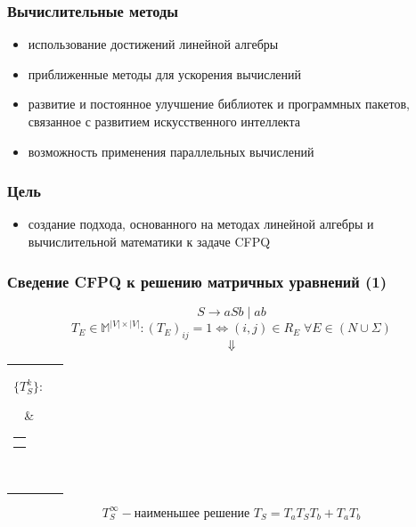 \documentclass[xcolor=table]{beamer}
\begin{document}
\begin{frame}[fragile]
  \transwipe[direction=90]
  \frametitle{Вычислительные методы}
\begin{itemize}
  \item использование достижений линейной алгебры
  \item приближенные методы для ускорения вычислений
  \item развитие и постоянное улучшение библиотек и программных пакетов, связанное с развитием искусственного интеллекта 
  \item возможность применения параллельных вычислений
\end{itemize}
\end{frame}

\begin{frame}[fragile]
  \transwipe[direction=90]
  \frametitle{Цель}
\begin{itemize}
  \item создание подхода, основанного на методах линейной алгебры и вычислительной математики к задаче CFPQ
\end{itemize}



\end{frame}


\begin{frame}[fragile]
  \transwipe[direction=90]
  \frametitle{Сведение CFPQ к решению матричных уравнений (1)}
  
  $$S \rightarrow aSb \mid ab$$
  $$T_E \in \mathbb{M}^{|V| \times |V|}: (T_{E})_{ij} = 1 \iff (i,j) \in R_E \; \forall E \in (N \cup \Sigma)$$
  \pause
  $$\Downarrow$$
    \centering
    \begin{tabular}{cl}
    \parbox{0.07\linewidth}{
    $$\{ T_S^k \}:$$
    }
    & \begin{tabular}{l}
    $T_S^0 = \mathbf{0}$ \\
    $T_S^{k+1} = T_a T_S^k T_b + T_a T_b$
    \end{tabular} \\
    \end{tabular}

  $$T_S^{\infty} - \texttt{наименьшее решение } T_S = T_aT_ST_b + T_aT_b$$

\end{frame}
\end{document}
